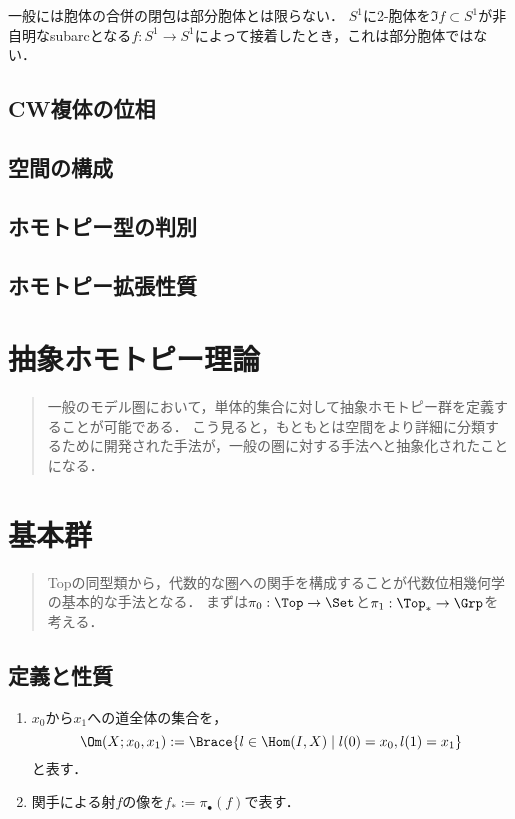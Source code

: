 \documentclass[uplatex, dvipdfmx]{jsreport}
\begin{document}
\begin{remark}
    一般には胞体の合併の閉包は部分胞体とは限らない．
    $S^1$に2-胞体を$\Im f\subset S^1$が非自明なsubarcとなる$f:S^1\to S^1$によって接着したとき，これは部分胞体ではない．
\end{remark}

\section{CW複体の位相}

\section{空間の構成}

\section{ホモトピー型の判別}

\section{ホモトピー拡張性質}

\chapter{抽象ホモトピー理論}

\begin{quotation}
    一般のモデル圏において，単体的集合に対して抽象ホモトピー群を定義することが可能である．
    こう見ると，もともとは空間をより詳細に分類するために開発された手法が，一般の圏に対する手法へと抽象化されたことになる．
\end{quotation}

\chapter{基本群}

\begin{quotation}
    Topの同型類から，代数的な圏への関手を構成することが代数位相幾何学の基本的な手法となる．
    まずは$\pi_0:\Top\to\Set$と$\pi_1:\Top_*\to\Grp$を考える．
\end{quotation}

\section{定義と性質}

\begin{notation}\mbox{}
    \begin{enumerate}
        \item $x_0$から$x_1$への道全体の集合を，
        \[\Om(X;x_0,x_1):=\Brace{l\in\Hom(I,X)\mid l(0)=x_0,l(1)=x_1}\]
        と表す．
        \item 関手による射$f$の像を$f_*:=\pi_\bullet(f)$で表す．
    \end{enumerate}
\end{notation}
\end{document}
